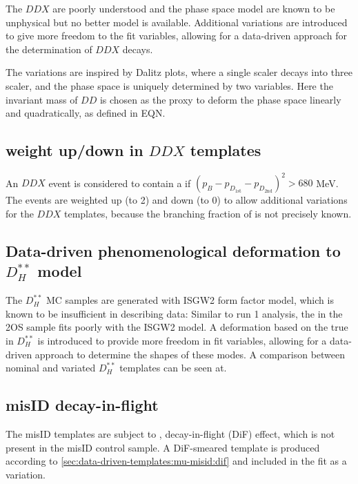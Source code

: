 The $DDX$ are poorly understood and the phase space model are known to be
unphysical but no better model is available.
Additional variations are introduced to give more freedom to the fit variables,
allowing for a data-driven approach for the determination of $DDX$ decays.

The variations are inspired by Dalitz plots, where a single scaler decays into
three scaler, and the phase space is uniquely determined by two variables.
Here the invariant mass of $DD$ is chosen as the proxy to deform the phase
space linearly and quadratically, as defined in EQN.


\subsection{\Kstar weight up/down in $DDX$ templates}

An $DDX$ event is considered to contain a \Kstar if
$(p_B - p_{D_\text{1st}} - p_{D_\text{2nd}})^2 > 680$ MeV.
The \Kstar events are weighted up (to 2) and down (to 0) to allow additional
variations for the $DDX$ templates, because the
branching fraction of \Kstar is not precisely known.


\subsection{Data-driven phenomenological deformation to $D_H^{**}$ model}

The $D_H^{**}$ MC samples are generated with ISGW2 form factor model, which
is known to be insufficient in describing data:
Similar to run 1 analysis, the \qSq in the 2OS sample fits poorly with the ISGW2
model.
A deformation based on the true \qSq
in $D_H^{**}$ is introduced to provide more freedom in fit variables,
allowing for a data-driven approach to determine the shapes of these modes.
A comparison between nominal and variated $D_H^{**}$ templates can be seen at.


\subsection{misID decay-in-flight}

The \muon misID templates are subject to \kaon, \pion decay-in-flight (DiF)
effect,
which is not present in the \muon misID control sample.
A DiF-smeared template is produced according to
\cref{sec:data-driven-templates:mu-misid:dif} and included in the fit as a
variation.



